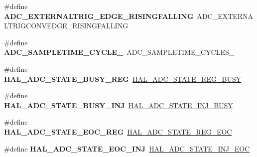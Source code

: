 \begin{DoxyCompactItemize}
\item 
\hypertarget{group___h_a_l___a_d_c___aliased___defines_gaa0c1b4c780d8091fd60f2624ceb2f3a4}{\#define {\bfseries A\-D\-C\-\_\-\-E\-X\-T\-E\-R\-N\-A\-L\-T\-R\-I\-G\-\_\-\-E\-D\-G\-E\-\_\-\-R\-I\-S\-I\-N\-G\-F\-A\-L\-L\-I\-N\-G}~A\-D\-C\-\_\-\-E\-X\-T\-E\-R\-N\-A\-L\-T\-R\-I\-G\-C\-O\-N\-V\-E\-D\-G\-E\-\_\-\-R\-I\-S\-I\-N\-G\-F\-A\-L\-L\-I\-N\-G}\label{group___h_a_l___a_d_c___aliased___defines_gaa0c1b4c780d8091fd60f2624ceb2f3a4}

\item 
\hypertarget{group___h_a_l___a_d_c___aliased___defines_ga5a51fc2613e4af9bd780b00878393cc0}{\#define {\bfseries A\-D\-C\-\_\-\-S\-A\-M\-P\-L\-E\-T\-I\-M\-E\-\_\-C\-Y\-C\-L\-E\-\_}~A\-D\-C\-\_\-\-S\-A\-M\-P\-L\-E\-T\-I\-M\-E\-\_\-C\-Y\-C\-L\-E\-S\-\_}\label{group___h_a_l___a_d_c___aliased___defines_ga5a51fc2613e4af9bd780b00878393cc0}

\item 
\hypertarget{group___h_a_l___a_d_c___aliased___defines_ga3bfd5015d60e3116e55ff81e6627f041}{\#define {\bfseries H\-A\-L\-\_\-\-A\-D\-C\-\_\-\-S\-T\-A\-T\-E\-\_\-\-B\-U\-S\-Y\-\_\-\-R\-E\-G}~\hyperlink{group___a_d_c___exported___types_ga516d4b4ebc261c241c69d96aae19acc3}{H\-A\-L\-\_\-\-A\-D\-C\-\_\-\-S\-T\-A\-T\-E\-\_\-\-R\-E\-G\-\_\-\-B\-U\-S\-Y}}\label{group___h_a_l___a_d_c___aliased___defines_ga3bfd5015d60e3116e55ff81e6627f041}

\item 
\hypertarget{group___h_a_l___a_d_c___aliased___defines_ga9dc7360fd46380f3149e09780cd8f4b4}{\#define {\bfseries H\-A\-L\-\_\-\-A\-D\-C\-\_\-\-S\-T\-A\-T\-E\-\_\-\-B\-U\-S\-Y\-\_\-\-I\-N\-J}~\hyperlink{group___a_d_c___exported___types_ga0044d240de80a70923b5c970d19ba24b}{H\-A\-L\-\_\-\-A\-D\-C\-\_\-\-S\-T\-A\-T\-E\-\_\-\-I\-N\-J\-\_\-\-B\-U\-S\-Y}}\label{group___h_a_l___a_d_c___aliased___defines_ga9dc7360fd46380f3149e09780cd8f4b4}

\item 
\hypertarget{group___h_a_l___a_d_c___aliased___defines_ga12555d013385a39ef776f1177420033c}{\#define {\bfseries H\-A\-L\-\_\-\-A\-D\-C\-\_\-\-S\-T\-A\-T\-E\-\_\-\-E\-O\-C\-\_\-\-R\-E\-G}~\hyperlink{group___a_d_c___exported___types_gae2da191bffb720a553a1e39c10929711}{H\-A\-L\-\_\-\-A\-D\-C\-\_\-\-S\-T\-A\-T\-E\-\_\-\-R\-E\-G\-\_\-\-E\-O\-C}}\label{group___h_a_l___a_d_c___aliased___defines_ga12555d013385a39ef776f1177420033c}

\item 
\hypertarget{group___h_a_l___a_d_c___aliased___defines_ga2d1ddc7f0311b8faf6266a3e3c005c28}{\#define {\bfseries H\-A\-L\-\_\-\-A\-D\-C\-\_\-\-S\-T\-A\-T\-E\-\_\-\-E\-O\-C\-\_\-\-I\-N\-J}~\hyperlink{group___a_d_c___exported___types_gafcfffd11ab8b84d3b0a1ce50ccf821d5}{H\-A\-L\-\_\-\-A\-D\-C\-\_\-\-S\-T\-A\-T\-E\-\_\-\-I\-N\-J\-\_\-\-E\-O\-C}}\label{group___h_a_l___a_d_c___aliased___defines_ga2d1ddc7f0311b8faf6266a3e3c005c28}


\end{DoxyCompactItemize}
